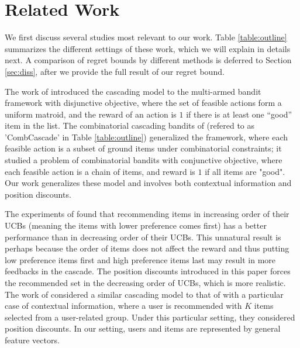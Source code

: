 \documentclass{article}
\newcommand{\shuai}[1]{{\color{brown!60!black} [\text{Shuai:} #1]}}
\begin{document}


\section{Related Work}

We first discuss several studies most relevant to our work.
Table \ref{table:outline} summarizes the different settings of these work, 
	which we will explain in details next.
A comparison of regret bounds by different methods is deferred to Section \ref{sec:diss},
	after we provide the full result of our regret bound.

The work of \cite{kveton2015cascading} introduced the cascading model to the multi-armed bandit framework with disjunctive objective, where the set of feasible actions form a uniform matroid, and the reward of an action is $1$ if there is at least one ``good'' item in the list. 
The combinatorial cascading bandits of \cite{kveton2015combinatorial} (refered to as 'CombCascade' in Table \ref{table:outline}) generalized the framework, where each feasible action is a subset of ground items under combinatorial constraints; it studied a problem of combinatorial bandits with conjunctive objective, where each feasible action is a chain of items, and reward is $1$ if all items are "good". 
Our work generalizes these model and involves both contextual information and position discounts.

The experiments of \cite{kveton2015cascading} found that recommending items in increasing order of their UCBs (meaning the items with lower preference comes first) has a better performance than in decreasing order of their UCBs.
This unnatural result is perhaps because the order of items does not affect the reward and thus
	putting low preference items first and high preference items last may result in more feedbacks
	in the cascade.
The position discounts introduced in this paper forces the recommended set in the decreasing order 
	of UCBs, which is more realistic.
The work of \cite{combes2015learning} considered a similar cascading model to that of \cite{kveton2015cascading} with a particular case of contextual information, where a user is recommended with $K$ items selected from a user-related group. Under this particular setting, they considered position discounts.
In our setting, users and items are represented by general feature vectors.
\end{document}
